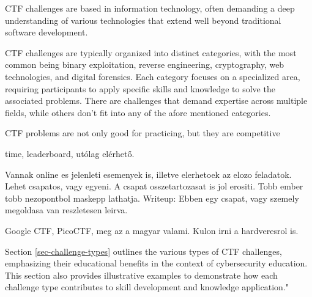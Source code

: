 \documentclass[conference]{IEEEtran}
\begin{document}
CTF challenges are based in information technology, often demanding a deep
understanding of various technologies that extend well beyond traditional
software development.

CTF challenges are typically organized into distinct categories, with the most
common being binary exploitation, reverse engineering, cryptography, web
technologies, and digital forensics. Each category focuses on a specialized
area, requiring participants to apply specific skills and knowledge to solve
the associated problems. There are challenges that demand expertise across multiple
fields, while others don't fit into any of the afore mentioned categories.

CTF problems are not only good for practicing, but they are competitive

time, leaderboard, utólag elérhető.

Vannak online es jelenleti esemenyek
is, illetve elerhetoek az elozo feladatok. Lehet csapatos, vagy egyeni.
A csapat osszetartozasat is jol erositi. Tobb ember tobb nezopontbol maskepp lathatja.
Writeup: Ebben egy csapat, vagy szemely megoldasa van reszletesen leirva.

Google CTF, PicoCTF, meg az a magyar valami. Kulon irni a hardveresrol is.

Section \ref{sec-challenge-types} outlines the various types of CTF challenges,
emphasizing their educational benefits in the context of cybersecurity
education. This section also provides illustrative examples to demonstrate how
each challenge type contributes to skill development and knowledge
application."

\cite{gyorok2014}
\cite{safar2019}
\cite{beszedes2023}

\cite{rahman2020}

\cite{schneider2013}

\cite{lhee2003}

\cite{morkel2005}

\cite{luciano1987}

\cite{ndatinya2015}

\cite{stallman1988}

\cite{eagle2020}

\cite{butun2019}

\cite{prinetto2020}

\cite{ziade2004}
\end{document}
